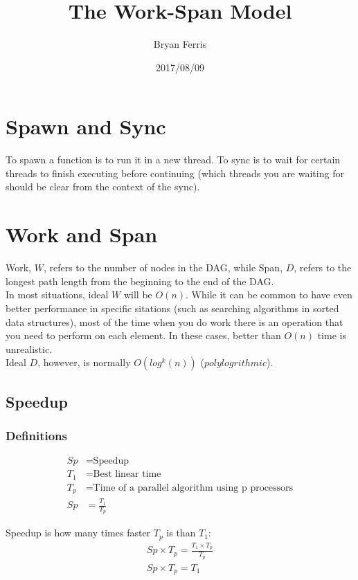 \documentclass{standalone}
\title{The Work-Span Model}
\date{2017/08/09}
\author{Bryan Ferris}
\begin{document}
\ifstandalone
\maketitle
{}

\newpage
{}
\fi

\section{Spawn and Sync}
To spawn a function is to run it in a new thread. To sync is to wait for certain
threads to finish executing before continuing (which threads you are waiting for
should be clear from the context of the sync).

\section{Work and Span}
Work, $W$, refers to the number of nodes in the DAG, while Span, $D$, refers to
the longest path length from the beginning to the end of the DAG.\\

In most situations, ideal $W$ will be $O(n)$. While it can be common to have
even better performance in specific sitations (such as searching algorithms in
sorted data structures), most of the time when you do work there is an operation
that you need to perform on each element. In these cases, better than $O(n)$
time is unrealistic.\\

Ideal $D$, however, is normally $O(log^k(n))$ ($polylogrithmic$).

\subsection{Speedup}

\subsubsection{Definitions}
\begin{align*}
	Sp &= \text{Speedup}\\
	T_1 &= \text{Best linear time}\\
	T_p &= \text{Time of a parallel algorithm using p processors}\\
	Sp &= \frac{T_1}{T_p}
\end{align*}

Speedup is how many times faster $T_p$ is than $T_1$:
\begin{align*}
	Sp \times T_p = \frac{T_1 \times T_p}{T_p}\\
	Sp \times T_p = T_1
\end{align*}
\end{document}
